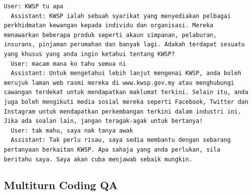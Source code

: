 \documentclass{article}
\begin{document}
\begin{lstlisting}[breaklines=true]
  User: KWSP tu apa
  Assistant: KWSP ialah sebuah syarikat yang menyediakan pelbagai perkhidmatan kewangan kepada individu dan organisasi. Mereka menawarkan beberapa produk seperti akaun simpanan, pelaburan, insurans, pinjaman perumahan dan banyak lagi. Adakah terdapat sesuatu yang khusus yang anda ingin ketahui tentang KWSP?
  User: macam mana ko tahu semua ni
  Assistant: Untuk mengetahui lebih lanjut mengenai KWSP, anda boleh merujuk laman web rasmi mereka di www.kwsp.gov.my atau menghubungi cawangan terdekat untuk mendapatkan maklumat terkini. Selain itu, anda juga boleh mengikuti media sosial mereka seperti Facebook, Twitter dan Instagram untuk mendapatkan perkembangan terkini dalam industri ini. Jika ada soalan lain, jangan teragak-agak untuk bertanya!
  User: tak mahu, saya nak tanya awak
  Assistant: Tak perlu risau, saya sedia membantu dengan sebarang pertanyaan berkaitan KWSP. Apa sahaja yang anda perlukan, sila beritahu saya. Saya akan cuba menjawab sebaik mungkin.
\end{lstlisting}

\subsection{Multiturn Coding QA}
\end{document}
